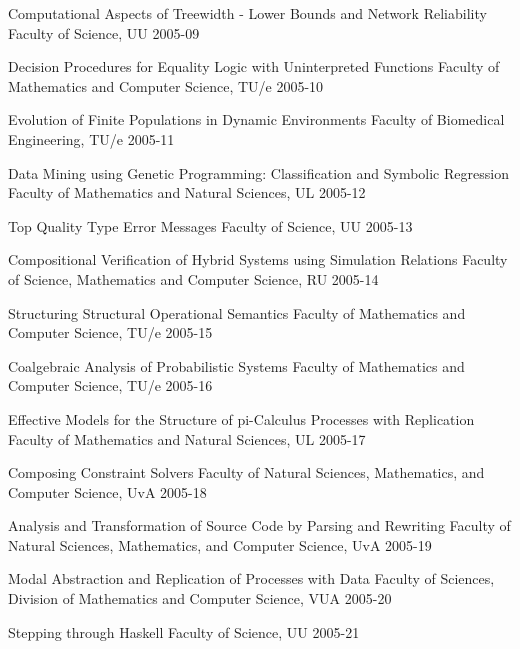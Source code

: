 \begin{multicols}{2}
        {Computational Aspects of Treewidth - Lower Bounds and Network Reliability}
        {Faculty of Science, UU}
        {2005-09}

        {Decision Procedures for Equality Logic with Uninterpreted Functions}
        {Faculty of Mathematics and Computer Science, TU/e}
        {2005-10}

        {Evolution of Finite Populations in Dynamic Environments}
        {Faculty of Biomedical Engineering, TU/e}
        {2005-11}

        {Data Mining using Genetic Programming: Classification and Symbolic Regression}
        {Faculty of Mathematics and Natural Sciences, UL}
        {2005-12}

        {Top Quality Type Error Messages}
        {Faculty of Science, UU}
        {2005-13}

        {Compositional Verification of Hybrid Systems using Simulation Relations}
        {Faculty of Science, Mathematics and Computer Science, RU}
        {2005-14}

        {Structuring Structural Operational Semantics}
        {Faculty of Mathematics and Computer Science, TU/e}
        {2005-15}

        {Coalgebraic Analysis of Probabilistic Systems}
        {Faculty of Mathematics and Computer Science, TU/e}
        {2005-16}

        {Effective Models for the Structure of pi-Calculus Processes with Replication}
        {Faculty of Mathematics and Natural Sciences, UL}
        {2005-17}

        {Composing Constraint Solvers}
        {Faculty of Natural Sciences, Mathematics, and Computer Science, UvA}
        {2005-18}

        {Analysis and Transformation of Source Code by Parsing and Rewriting}
        {Faculty of Natural Sciences, Mathematics, and Computer Science, UvA}
        {2005-19}

        {Modal Abstraction and Replication of Processes with Data}
        {Faculty of Sciences, Division of Mathematics and Computer Science, VUA}
        {2005-20}

        {Stepping through Haskell}
        {Faculty of Science, UU}
        {2005-21}

\end{multicols}

